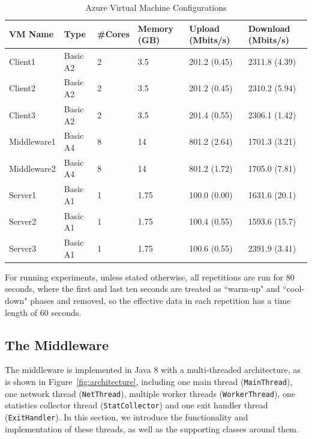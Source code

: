 \begin{table}[h]
\begin{tabular}{llllll}
\hline
VM Name     & Type     & \#Cores & Memory (GB) & Upload (Mbits/s) & Download (Mbits/s) \\ \hline
Client1     & Basic A2 & 2       & 3.5         & 201.2 (0.45)  & 2311.8 (4.39)   \\
Client2     & Basic A2 & 2       & 3.5         & 201.2 (0.45)  & 2310.2 (5.94)   \\
Client3     & Basic A2 & 2       & 3.5         & 201.4 (0.55)  & 2306.1 (1.42)   \\
Middleware1 & Basic A4 & 8       & 14          & 801.2 (2.64)  & 1701.3 (3.21)   \\
Middleware2 & Basic A4 & 8       & 14          & 801.2 (1.72)  & 1705.0 (7.81)   \\
Server1     & Basic A1 & 1       & 1.75        & 100.0 (0.00)  & 1631.6 (20.1)   \\
Server2     & Basic A1 & 1       & 1.75        & 100.4 (0.55)  & 1593.6 (15.7)   \\
Server3     & Basic A1 & 1       & 1.75        & 100.6 (0.55)  & 2391.9 (3.41)   \\ \hline
\end{tabular}
\caption{\label{table:azure_config}Azure Virtual Machine Configurations}
\end{table}

For running experiments, unless stated otherwise, all repetitions are run for 80 seconds, where the first and last ten seconds are treated as ``warm-up" and ``cool-down" phases and removed, so the effective data in each repetition has a time length of 60 seconds.

\subsection{The Middleware} \label{architecture}

The middleware is implemented in Java 8 with a multi-threaded architecture, as is shown in Figure~\ref{fig:architecture}, including one main thread (\texttt{MainThread}), one network thread (\texttt{NetThread}), multiple worker threads (\texttt{WorkerThread}), one statistics collector thread (\texttt{StatCollector}) and one exit handler thread (\texttt{ExitHandler}). In this section, we introduce the functionality and implementation of these threads, as well as the supporting classes around them.

